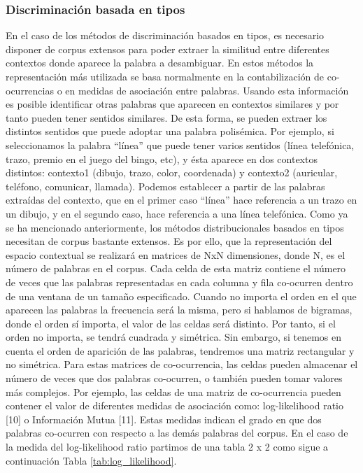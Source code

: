 \subsubsection*{Discriminación basada en tipos}
En el caso de los métodos de discriminación basados en tipos, es necesario disponer de corpus extensos para poder extraer la similitud entre diferentes contextos donde aparece la palabra a desambiguar. En estos métodos la representación más utilizada se basa normalmente en la contabilización de co-ocurrencias o en medidas de asociación entre palabras. Usando esta información es posible identificar otras palabras que aparecen en contextos similares y por tanto pueden tener sentidos similares. De esta forma, se pueden extraer los distintos sentidos que puede adoptar una palabra polisémica. Por ejemplo, si seleccionamos la palabra “línea” que puede tener varios sentidos (línea telefónica, trazo, premio en el juego del bingo, etc), y ésta aparece en dos contextos distintos: contexto1 (dibujo, trazo, color, coordenada) y contexto2 (auricular, teléfono, comunicar, llamada). Podemos establecer a partir de las palabras extraídas del contexto, que en el primer caso “línea” hace referencia a un trazo en un dibujo, y en el segundo caso, hace referencia a una línea telefónica. Como ya se ha mencionado anteriormente, los métodos distribucionales basados en tipos necesitan de corpus bastante extensos. Es por ello, que la representación del espacio contextual se realizará en matrices de NxN dimensiones, donde N, es el número de palabras en el corpus. Cada celda de esta matriz contiene el número de veces que las palabras representadas en cada columna y fila co-ocurren dentro de una ventana de un tamaño especificado. Cuando no importa el orden en el que aparecen las palabras la frecuencia será la misma, pero si hablamos de bigramas, donde el orden sí importa, el valor de las celdas será distinto. Por tanto, si el orden no importa, se tendrá   cuadrada y simétrica. Sin embargo, si tenemos en cuenta el orden de aparición de las palabras, tendremos una matriz rectangular y no simétrica. Para estas matrices de co-ocurrencia, las celdas pueden almacenar el número de veces que dos palabras co-ocurren, o también pueden tomar valores más complejos. Por ejemplo, las celdas de una matriz de co-ocurrencia pueden contener el valor de diferentes medidas de asociación como: log-likelihood ratio [10] o Información Mutua [11]. Estas medidas indican el grado en que dos palabras co-ocurren con respecto a las demás palabras del corpus. En el caso de la medida del log-likelihood ratio partimos de una tabla 2 x 2 como sigue a continuación Tabla \ref{tab:log_likelihood}.

